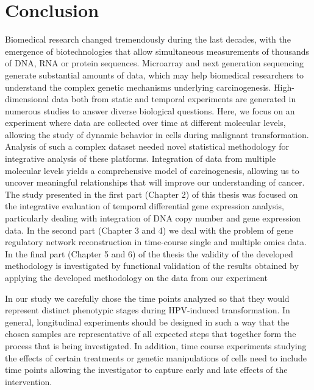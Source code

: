 \chapter{Conclusion}
\label{chapter:Window estimator}


Biomedical research changed tremendously during the last decades, with the emergence of biotechnologies that allow simultaneous measurements of thousands of DNA, RNA or protein sequences. Microarray and next generation sequencing generate substantial amounts of data, which may help biomedical researchers to understand the complex genetic mechanisms underlying carcinogenesis. High-dimensional data both from static and temporal experiments are generated in numerous studies to answer diverse biological questions. Here, we focus on an experiment where data are collected over time at different molecular levels, allowing the study of dynamic behavior in cells during malignant transformation. Analysis of such a complex dataset needed novel statistical methodology for integrative analysis of these platforms. Integration of data from multiple molecular levels yields a comprehensive model of carcinogenesis, allowing us to uncover meaningful relationships that will improve our understanding of cancer. The study presented in the first part (Chapter 2) of this thesis was focused on the integrative evaluation of temporal differential gene expression analysis, particularly dealing with integration of DNA copy number and gene expression data. In the second part (Chapter 3 and 4) we deal with the problem of gene regulatory network reconstruction in time-course single and multiple omics data. In the final part (Chapter 5 and 6) of the thesis the validity of the developed methodology is investigated by functional validation of the results obtained by applying the developed methodology on the data from our experiment 

In our study we carefully chose the time points analyzed so that they would represent distinct phenotypic stages during HPV-induced transformation. In general, longitudinal experiments should be designed in such a way that the chosen samples are representative of all expected steps that together form the process that is being investigated. In addition, time course experiments studying the effects of certain treatments or genetic manipulations of cells need to include time points allowing the investigator to capture early and late effects of the intervention.


